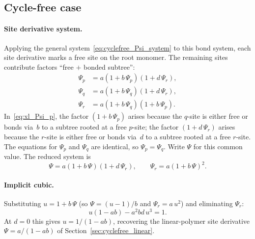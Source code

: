 \documentclass[11pt]{amsart}
\theoremstyle{definition}
\theoremstyle{plain}
\theoremstyle{remark}
\begin{document}
\subsection{Cycle-free case}
\label{sec:crosslinked_acyclic}

\paragraph{Site derivative system.}
Applying the general system~\eqref{eq:cyclefree_Psi_system} to this bond system, each site derivative marks a free site on the root monomer.
The remaining sites contribute factors ``free $+$ bonded subtree'':
\begin{align}
\Psi_p &= a(1+b\,\Psi_p)(1+d\,\Psi_r), \label{eq:xl_Psi_p}\\
\Psi_q &= a(1+b\,\Psi_q)(1+d\,\Psi_r), \label{eq:xl_Psi_q}\\
\Psi_r &= a(1+b\,\Psi_q)(1+b\,\Psi_p). \label{eq:xl_Psi_r}
\end{align}
In~\eqref{eq:xl_Psi_p}, the factor $(1+b\,\Psi_p)$ arises because the $q$-site is either free or bonds via~$b$ to a subtree rooted at a free $p$-site; the factor $(1+d\,\Psi_r)$ arises because the $r$-site is either free or bonds via~$d$ to a subtree rooted at a free $r$-site.
The equations for $\Psi_p$ and $\Psi_q$ are identical, so $\Psi_p=\Psi_q$.
Write $\Psi$ for this common value.
The reduced system is
\begin{equation}\label{eq:xl_reduced_system}
\Psi = a(1+b\,\Psi)(1+d\,\Psi_r),
\qquad
\Psi_r = a(1+b\,\Psi)^2.
\end{equation}

\paragraph{Implicit cubic.}
Substituting $u = 1+b\,\Psi$ (so $\Psi=(u-1)/b$ and $\Psi_r = a\,u^2$) and eliminating $\Psi_r$:
\begin{equation}\label{eq:xl_cubic}
u(1-ab) - a^2 b d\,u^3 = 1.
\end{equation}
At $d=0$ this gives $u=1/(1-ab)$, recovering the linear-polymer site derivative $\Psi=a/(1-ab)$ of Section~\ref{sec:cyclefree_linear}.
\end{document}
